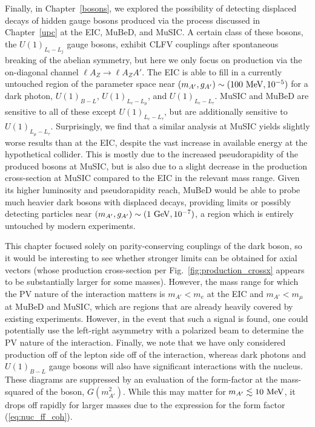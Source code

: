 Finally, in Chapter~\ref{bosons}, we explored the possibility of detecting displaced decays of hidden gauge bosons produced via the process discussed in Chapter~\ref{upc} at the EIC, MuBeD, and MuSIC. A certain class of these bosons, the $U(1)_{L_i - L_j}$ gauge bosons, exhibit CLFV couplings after spontaneous breaking of the abelian symmetry, but here we only focus on production via the on-diagonal channel $\ell A_Z \rightarrow \ell A_Z A'$. The EIC is able to fill in a currently untouched region of the parameter space near $(m_{A'}, g_{A'}) \sim (100~{\rm MeV}, 10^{-5})$ for a dark photon, $U(1)_{B-L}$, $U(1)_{L_e - L_\mu}$, and $U(1)_{L_e - L_\tau}$. MuSIC and MuBeD are sensitive to all of these except $U(1)_{L_e - L_\tau}$, but are additionally sensitive to $U(1)_{L_\mu - L_\tau}$. Surprisingly, we find that a similar analysis at MuSIC yields slightly worse results than at the EIC, despite the vast increase in available energy at the hypothetical collider. This is mostly due to the increased pseudorapidity of the produced bosons at MuSIC, but is also due to a slight decrease in the production cross-section at MuSIC compared to the EIC in the relevant mass range. Given its higher luminosity and pseudorapidity reach, MuBeD would be able to probe much heavier dark bosons with displaced decays, providing limits or possibly detecting particles near $(m_{A'}, g_{A'}) \sim (1~{\rm GeV}, 10^{-7})$, a region which is entirely untouched by modern experiments.  

This chapter focused solely on parity-conserving couplings of the dark boson, so it would be interesting to see whether stronger limits can be obtained for axial vectors (whose production cross-section per Fig.~\ref{fig:production_crossx} appears to be substantially larger for some masses). However, the mass range for which the PV nature of the interaction matters is $m_{A'} < m_e$ at the EIC and $m_{A'} < m_\mu$ at MuBeD and MuSIC, which are regions that are already heavily covered by existing experiments. However, in the event that such a signal is found, one could potentially use the left-right asymmetry with a polarized beam to determine the PV nature of the interaction. Finally, we note that we have only considered production off of the lepton side off of the interaction, whereas dark photons and $U(1)_{B-L}$ gauge bosons will also have significant interactions with the nucleus. These diagrams are suppressed by an evaluation of the form-factor at the mass-squared of the boson, $G(m_{A'}^2)$. While this may matter for $m_{A'} \lesssim 10~{\rm MeV}$, it drops off rapidly for larger masses due to the expression for the form factor (\ref{eq:nuc_ff_coh}).
